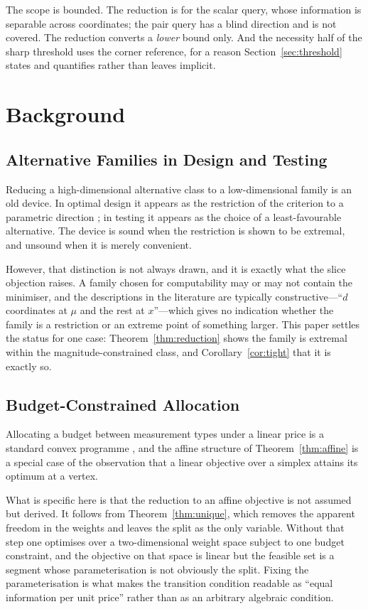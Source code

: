 \documentclass[conference]{IEEEtran}
\theoremstyle{definition}
\begin{document}
The scope is bounded. The reduction is for the scalar query, whose information is separable
across coordinates; the pair query has a blind direction and is not covered. The reduction
converts a \emph{lower} bound only. And the necessity half of the sharp threshold uses the
corner reference, for a reason Section~\ref{sec:threshold} states and quantifies rather than
leaves implicit.

\section{Background}

\subsection{Alternative Families in Design and Testing}

Reducing a high-dimensional alternative class to a low-dimensional family is an old device.
In optimal design it appears as the restriction of the criterion to a parametric direction
\cite{pukelsheim2006,fedorov1972}; in testing it appears as the choice of a least-favourable
alternative. The device is sound when the restriction is shown to be extremal, and unsound
when it is merely convenient.

However, that distinction is not always drawn, and it is exactly what the slice objection
raises. A family chosen for computability may or may not contain the minimiser, and the
descriptions in the literature are typically constructive---``$d$ coordinates at $\mu$ and
the rest at $x$''---which gives no indication whether the family is a restriction or an
extreme point of something larger. This paper settles the status for one case:
Theorem~\ref{thm:reduction} shows the family is extremal within the magnitude-constrained
class, and Corollary~\ref{cor:tight} that it is exactly so.

\subsection{Budget-Constrained Allocation}

Allocating a budget between measurement types under a linear price is a standard convex
programme \cite{boyd2004}, and the affine structure of Theorem~\ref{thm:affine} is a special
case of the observation that a linear objective over a simplex attains its optimum at a
vertex.

What is specific here is that the reduction to an affine objective is not assumed but
derived. It follows from Theorem~\ref{thm:unique}, which removes the apparent freedom in the
weights and leaves the split as the only variable. Without that step one optimises over a
two-dimensional weight space subject to one budget constraint, and the objective on that
space is linear but the feasible set is a segment whose parameterisation is not obviously the
split. Fixing the parameterisation is what makes the transition condition readable as ``equal
information per unit price'' rather than as an arbitrary algebraic condition.
\end{document}
